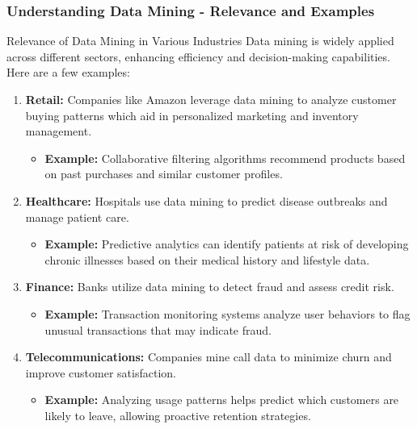 \documentclass[aspectratio=169]{beamer}
\begin{document}
\begin{frame}[fragile]
    \frametitle{Understanding Data Mining - Relevance and Examples}
    \begin{block}{Relevance of Data Mining in Various Industries}
        Data mining is widely applied across different sectors, enhancing efficiency and decision-making capabilities. Here are a few examples:
    \end{block}
    
    \begin{enumerate}
        \item \textbf{Retail:} Companies like Amazon leverage data mining to analyze customer buying patterns which aid in personalized marketing and inventory management.
            \begin{itemize}
                \item \textbf{Example:} Collaborative filtering algorithms recommend products based on past purchases and similar customer profiles.
            \end{itemize}
        \item \textbf{Healthcare:} Hospitals use data mining to predict disease outbreaks and manage patient care.
            \begin{itemize}
                \item \textbf{Example:} Predictive analytics can identify patients at risk of developing chronic illnesses based on their medical history and lifestyle data.
            \end{itemize}
        \item \textbf{Finance:} Banks utilize data mining to detect fraud and assess credit risk.
            \begin{itemize}
                \item \textbf{Example:} Transaction monitoring systems analyze user behaviors to flag unusual transactions that may indicate fraud.
            \end{itemize}
        \item \textbf{Telecommunications:} Companies mine call data to minimize churn and improve customer satisfaction.
            \begin{itemize}
                \item \textbf{Example:} Analyzing usage patterns helps predict which customers are likely to leave, allowing proactive retention strategies.
            \end{itemize}
    \end{enumerate}
\end{frame}
\end{document}

